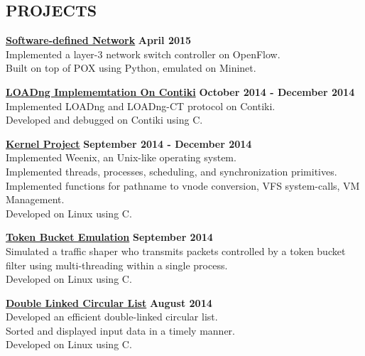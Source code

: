\documentclass[margin,line]{resume}
\begin{document}
\begin{resume}
\sectionline

    \section{\mysidestyle \textbf{\large{P}\small{ROJECTS}}}

    \textbf{\listing \href{https://github.com/bmyfish/OpenFlow_L3_Learning_Switch}{Software-defined Network}} \hfill \textbf{April 2015}\vspace{2mm}\\
    Implemented a layer-3 network switch controller on OpenFlow.\\
    Built on top of POX using Python, emulated on Mininet.     

    \textbf{\listing \href{https://github.com/bmyfish/LOADng-In-Contiki}{LOADng Implememtation On Contiki}} \hfill \textbf{October 2014 - December 2014}\vspace{1mm}\\
    Implemented LOADng and LOADng-CT protocol on Contiki.\\
    Developed and debugged on Contiki using C.  

    \textbf{\listing \href{https://github.com/bmyfish/Weenix}{Kernel Project}} \hfill \textbf{September 2014 - December 2014}\vspace{2mm}\\
    Implemented Weenix, an Unix-like operating system.\\
	Implemented threads, processes, scheduling, and synchronization primitives.\\
	Implemented functions for pathname to vnode conversion, VFS system-calls, VM Management.\\
	Developed on Linux using C. 

    \textbf{\listing \href{https://github.com/bmyfish/Token_Bucket_Emulation}{Token Bucket Emulation}} \hfill \textbf{September 2014}\vspace{2mm}\\
    Simulated a traffic shaper who transmits packets controlled by a token bucket filter using multi-threading within a single process.\\
    Developed on Linux using C.    

    \textbf{\listing \href{https://github.com/bmyfish/Double_Linked_Circular_List}{Double Linked Circular List}} \hfill \textbf{August 2014}\vspace{2mm}\\
    Developed an efficient double-linked circular list.\\
    Sorted and displayed input data in a timely manner.\\
    Developed on Linux using C.


\end{resume}
\end{document}

